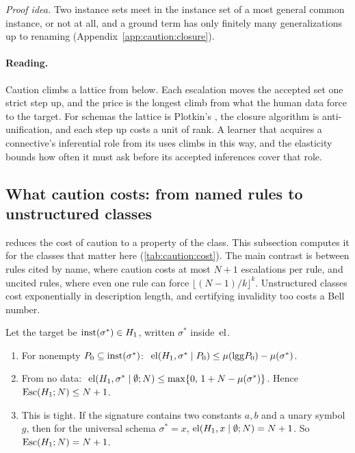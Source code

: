 \noindent\emph{Proof idea.} Two instance sets meet in the instance set of a most general common instance, or not at all, and a ground term has only finitely many generalizations up to renaming (Appendix~\ref{app:caution:closure}).

\paragraph{Reading.} Caution climbs a lattice from below. Each escalation moves the accepted set one strict step up, and the price is the longest climb from what the human data force to the target. For schemas the lattice is Plotkin's \citep{plotkin1970note,reynolds1970transformational}, the closure algorithm is anti-unification, and each step up costs a unit of rank. A learner that acquires a connective's inferential role from its uses climbs in this way, and the elasticity bounds how often it must ask before its accepted inferences cover that role.

\subsection{What caution costs: from named rules to unstructured classes}\label{sec:caution:cost}

 reduces the cost of caution to a property of the class. This subsection computes it for the classes that matter here (\cref{tab:caution:cost}). The main contrast is between rules cited by name, where caution costs at most $N+1$ escalations per rule, and uncited rules, where even one rule can force $\lfloor(N-1)/k\rfloor^k$. Unstructured classes cost exponentially in description length, and certifying invalidity too costs a Bell number.

\begin{theorem}\label{thm:caution:single}
Let the target be $\mathrm{inst}(\sigma^*)\in H_1$, written $\sigma^*$ inside~$\mathrm{el}$.
\begin{enumerate}[label=(\roman*)]
\item For nonempty $P_0\subseteq\mathrm{inst}(\sigma^*)$: $\ \mathrm{el}(H_1,\sigma^*\mid P_0)\le\mu(\mathrm{lgg} P_0)-\mu(\sigma^*)$.
\item From no data: $\ \el(H_1,\sigma^*\mid\emptyset;N)\le\max\{0,\,1+N-\mu(\sigma^*)\}$. Hence $\mathrm{Esc}(H_1;N)\le N+1$.
\item This is tight. If the signature contains two constants $a,b$ and a unary symbol~$g$, then for the universal schema $\sigma^*=x$, $\mathrm{el}(H_1,x\mid\emptyset;N)=N+1$. So $\mathrm{Esc}(H_1;N)=N+1$.
\end{enumerate}
\end{theorem}

